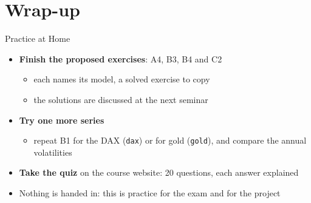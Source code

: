 \section{Wrap-up}

\begin{frame}{Practice at Home}
\itemsize{\small}
\begin{itemize}
    \item \textbf{Finish the proposed exercises}: A4, B3, B4 and C2
    \begin{itemize}
        \item each names its model, a solved exercise to copy
        \item the solutions are discussed at the next seminar
    \end{itemize}
    \item \textbf{Try one more series}
    \begin{itemize}
        \item repeat B1 for the DAX (\texttt{dax}) or for gold (\texttt{gold}), and compare the annual volatilities
    \end{itemize}
    \item \textbf{Take the  quiz} on the course website: 20 questions, each answer explained
    \item Nothing is handed in: this is practice for the exam and for the project
\end{itemize}
\end{frame}

